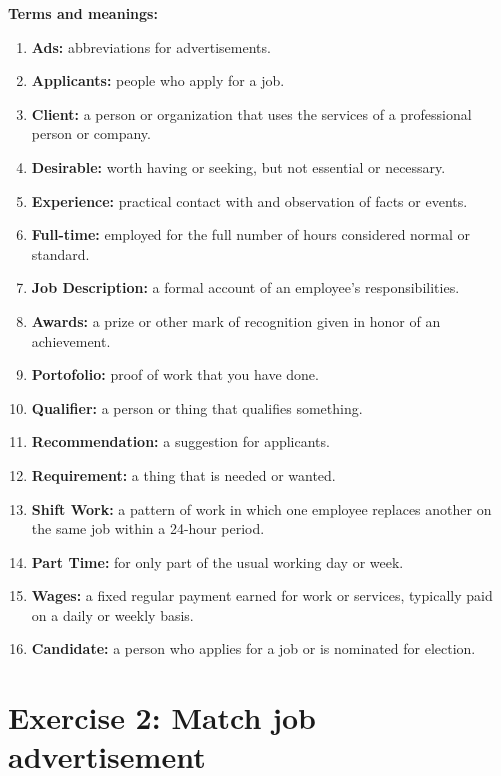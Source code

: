 \documentclass[12pt,titlepage]{article}
\begin{document}
\textbf{Terms and meanings:}
\begin{enumerate}
    \item {
        \textbf{Ads:} abbreviations for advertisements.
    }
    \item {
        \textbf{Applicants:} people who apply for a job.
    }
    \item {
        \textbf{Client:} a person or organization that uses the services of a professional person or company.
    }
    \item {
        \textbf{Desirable:} worth having or seeking, but not essential or necessary.
    }
    \item {
        \textbf{Experience:} practical contact with and observation of facts or events.
    }
    \item {
        \textbf{Full-time:} employed for the full number of hours considered normal or standard.
    }
    \item {
        \textbf{Job Description:} a formal account of an employee's responsibilities.
    }
    \item {
        \textbf{Awards:} a prize or other mark of recognition given in honor of an achievement.
    }
    \item {
        \textbf{Portofolio:} proof of work that you have done.
    }
    \item {
        \textbf{Qualifier:} a person or thing that qualifies something.
    }
    \item {
        \textbf{Recommendation:} a suggestion for applicants.
    }
    \item {
        \textbf{Requirement:} a thing that is needed or wanted.
    }
    \item {
        \textbf{Shift Work:} a pattern of work in which one employee replaces another on the same job within a 24-hour period.
    }
    \item {
        \textbf{Part Time:} for only part of the usual working day or week.
    }
    \item {
        \textbf{Wages:} a fixed regular payment earned for work or services, typically paid on a daily or weekly basis.
    }
    \item {
        \textbf{Candidate:} a person who applies for a job or is nominated for election.
    }
\end{enumerate}

\pagebreak

\section{Exercise 2: Match job advertisement}
\end{document}
